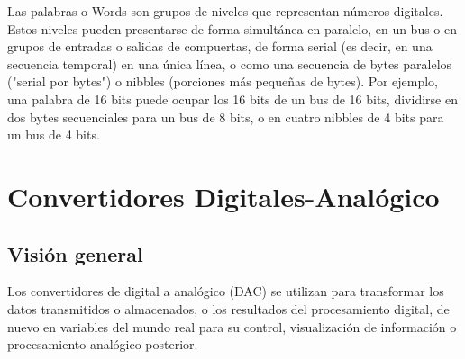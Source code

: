     {\color{red} Las palabras o Words son grupos de niveles que representan números digitales. Estos niveles pueden presentarse de forma simultánea en paralelo, en un bus o en grupos de entradas o salidas de compuertas, de forma serial (es decir, en una secuencia temporal) en una única línea, o como una secuencia de bytes paralelos ("serial por bytes") o nibbles (porciones más pequeñas de bytes). Por ejemplo, una palabra de 16 bits puede ocupar los 16 bits de un bus de 16 bits, dividirse en dos bytes secuenciales para un bus de 8 bits, o en cuatro nibbles de 4 bits para un bus de 4 bits.}

  \section{Convertidores Digitales-Analógico}

    \subsection{Visión general}

    Los convertidores de digital a analógico (DAC) se utilizan para transformar los datos transmitidos o almacenados, o los resultados del procesamiento digital, de nuevo en variables del mundo real para su control, visualización de información o procesamiento analógico posterior. \cite{Kester2007}




	
